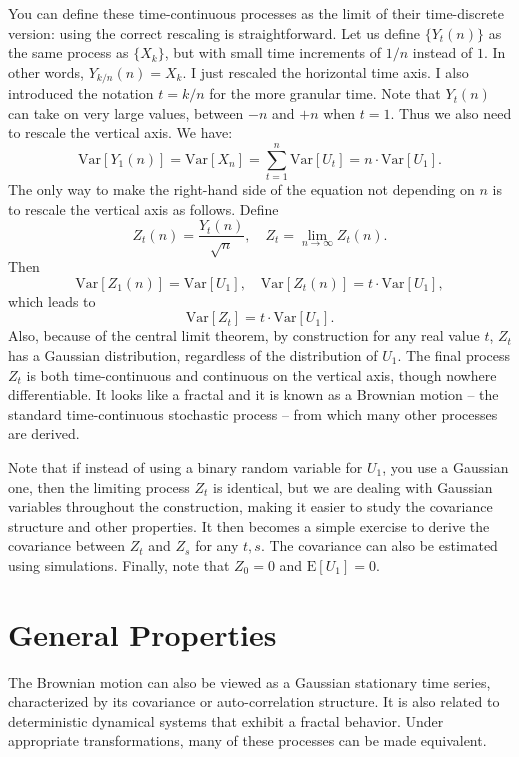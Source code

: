\documentclass[oneside,10pt]{book}
\begin{document}
You can define these time-continuous processes as the limit of their time-discrete version: using the correct rescaling is straightforward. Let us define $\{Y_t(n)\}$ as the same process as $\{X_k\}$, but with small time increments of $1/n$ instead of $1$.  In other words, $Y_{k/n}(n) = X_k$. I just rescaled the horizontal time axis. I also introduced the notation $t=k/n$ for the more granular time. Note that $Y_t(n)$ can  take on very large values, between $-n$ and $+n$ when $t = 1$. Thus we also need to rescale the vertical axis. We have:
$$
\text{Var}[Y_1(n)] =\text{Var}[X_n]  = \sum_{t=1}^n \text{Var}[U_t] = n\cdot \text{Var}[U_1].
$$
The only way to make the right-hand side of the equation not depending on $n$ is to rescale the vertical axis as follows. Define
$$
Z_t(n) = \frac{Y_t(n)}{\sqrt{n}}, \quad Z_t = \lim_{n\rightarrow\infty} Z_t(n).
$$
Then
$$
\text{Var}[Z_1(n)] = \text{Var}[U_1], \quad \text{Var}[Z_t(n)] = t\cdot \text{Var}[U_1], 
$$
which leads to 
\begin{equation}
\text{Var}[Z_t] = t \cdot \text{Var}[U_1].\label{eq1}
\end{equation}
Also, because of the central limit theorem, by construction for any real value $t$, $Z_t$ has a Gaussian distribution, regardless of the distribution of $U_1$. The final process $Z_t$ is both time-continuous and continuous on the vertical axis, though nowhere differentiable. It looks like a fractal and it is known as a Brownian motion -- the standard time-continuous stochastic process -- from which many other processes are derived. 

Note that if instead of using a binary random variable for $U_1$, you use a Gaussian one, then the limiting process 
$Z_t$ is identical, but we are dealing with Gaussian variables throughout the construction, making it easier to study the covariance structure and other properties. It then becomes a simple exercise to derive the covariance between $Z_t$ and $Z_s$ for any $t,s$. The covariance can also be estimated using simulations. Finally, note that $Z_0 = 0$ and $\text{E}[U_1] = 0$. 

\section{General Properties}

The Brownian motion can also be viewed as a Gaussian stationary time series, characterized by its covariance or auto-correlation structure. It is also related to deterministic dynamical systems  that exhibit a fractal behavior. Under appropriate transformations, many of these processes can be made equivalent.  
\end{document}
